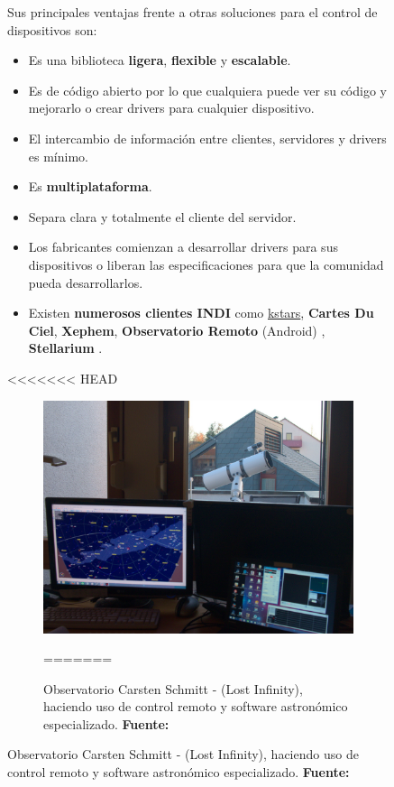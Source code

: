 \begin{itemize}
\begin{itemize}
\begin{figure}[h]
Sus principales ventajas frente a otras soluciones para el control de dispositivos son:


\begin{itemize}
	\setlength\itemsep{0.2em}
	\item Es una biblioteca \textbf{ligera}, \textbf{flexible} y \textbf{escalable}.
	\item Es de código abierto por lo que cualquiera puede ver su código y mejorarlo o crear drivers para cualquier dispositivo.
	\item El intercambio de información entre clientes, servidores y drivers es mínimo.
	\item Es \textbf{multiplataforma}.
	\item Separa clara y totalmente el cliente del servidor.
	\item Los fabricantes comienzan a desarrollar drivers para sus dispositivos o liberan las especificaciones para que la comunidad pueda desarrollarlos.
	\item Existen \textbf{numerosos clientes INDI} como \href{https://edu.kde.org/kstars/}{kstars}, \textbf{Cartes Du Ciel}, \textbf{Xephem}, \textbf{Observatorio Remoto} (Android) \cite{obsremoto}, \textbf{Stellarium} \cite{stellarium}.
	
\end{itemize}

<<<<<<< HEAD
\begin{figure}[h]
	\centering
	\includegraphics[width=0.9\linewidth]{../images/robotizacion}
	\caption[Observatorio Carsten Schmitt]{Observatorio Carsten Schmitt - (Lost Infinity), haciendo uso de control remoto y software astronómico especializado. \textbf{Fuente:} \cite{lost_infinity}}
	\label{fig:robotizacion}
=======


\end{figure}
\end{figure}
\end{itemize}
\end{itemize}
